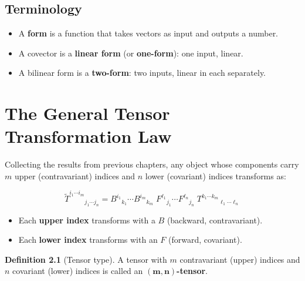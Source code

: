 \documentclass[12pt, a4paper]{report}
\theoremstyle{definition}
\newtheorem{definition}{Definition}[chapter]
\theoremstyle{plain}
\theoremstyle{remark}
\begin{document}
\section{Terminology}

\begin{itemize}[nosep]
    \item A \textbf{form} is a function that takes vectors as input and outputs a
          number.
    \item A covector is a \textbf{linear form} (or \textbf{one-form}): one input,
          linear.
    \item A bilinear form is a \textbf{two-form}: two inputs, linear in each
          separately.
\end{itemize}

\chapter{The General Tensor Transformation Law}\label{ch:general-law}

Collecting the results from previous chapters, any object whose components carry $m$
upper (contravariant) indices and $n$ lower (covariant) indices transforms as:

\begin{equation}\label{eq:general-transform}
    \boxed{
    \tilde{T}^{i_1 \cdots i_m}{}_{j_1 \cdots j_n}
    = B^{i_1}{}_{k_1} \cdots B^{i_m}{}_{k_m}\;
      F^{\ell_1}{}_{j_1} \cdots F^{\ell_n}{}_{j_n}\;
      T^{k_1 \cdots k_m}{}_{\ell_1 \cdots \ell_n}
    }
\end{equation}

\begin{itemize}[nosep]
    \item Each \textbf{upper index} transforms with a $B$ (backward, contravariant).
    \item Each \textbf{lower index} transforms with an $F$ (forward, covariant).
\end{itemize}

\begin{definition}[Tensor type]
A tensor with $m$ contravariant (upper) indices and $n$ covariant (lower) indices is
called an $\bm{(m,n)}$\textbf{-tensor}.
\end{definition}
\end{document}
